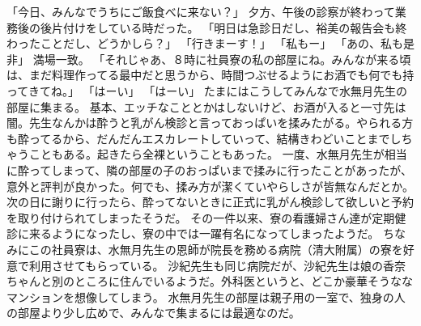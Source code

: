 「今日、みんなでうちにご飯食べに来ない？」
夕方、午後の診察が終わって業務後の後片付けをしている時だった。
「明日は急診日だし、裕美の報告会も終わったことだし、どうかしら？」
「行きまーす！」
「私もー」
「あの、私も是非」
満場一致。
「それじゃあ、８時に社員寮の私の部屋にね。みんなが来る頃は、まだ料理作ってる最中だと思うから、時間つぶせるようにお酒でも何でも持ってきてね。」
「はーい」
「はーい」
たまにはこうしてみんなで水無月先生の部屋に集まる。
基本、エッチなこととかはしないけど、お酒が入ると一寸先は闇。先生なんかは酔うと乳がん検診と言っておっぱいを揉みたがる。やられる方も酔ってるから、だんだんエスカレートしていって、結構きわどいことまでしちゃうこともある。起きたら全裸ということもあった。
一度、水無月先生が相当に酔ってしまって、隣の部屋の子のおっぱいまで揉みに行ったことがあったが、意外と評判が良かった。何でも、揉み方が潔くていやらしさが皆無なんだとか。次の日に謝りに行ったら、酔ってないときに正式に乳がん検診して欲しいと予約を取り付けられてしまったそうだ。
その一件以来、寮の看護婦さん達が定期健診に来るようになったし、寮の中では一躍有名になってしまったようだ。
ちなみにこの社員寮は、水無月先生の恩師が院長を務める病院（清大附属）の寮を好意で利用させてもらっている。
沙紀先生も同じ病院だが、沙紀先生は娘の香奈ちゃんと別のところに住んでいるようだ。外科医というと、どこか豪華そうななマンションを想像してしまう。
水無月先生の部屋は親子用の一室で、独身の人の部屋より少し広めで、みんなで集まるには最適なのだ。

